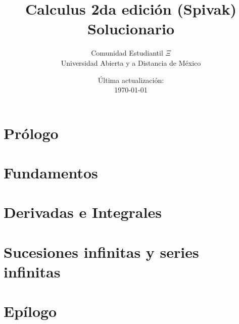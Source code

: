 \documentclass[12pt]{book}
\title{Calculus 2da edición (Spivak) \\ Solucionario}
\author{Comunidad Estudiantil $\Xi$ \\ Universidad Abierta y a Distancia de México}
\date{Última actualización: \\ \today}
\begin{document}
\maketitle

\newcommand{\solucion}{\underline{Solución} \vspace*{0.2cm}}

\tableofcontents

\part{Prólogo}



\part{Fundamentos}







\part{Derivadas e Integrales}











\part{Sucesiones infinitas y series infinitas}









\part{Epílogo}



\end{document}
